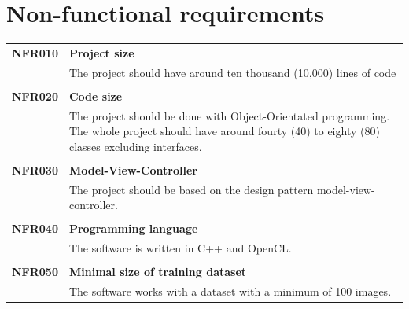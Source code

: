 \documentclass[parskip=full]{scrartcl}
\begin{document}
\section{Non-functional requirements}
\begin{tabular}{p{2cm}p{11.4cm}}
\textbf{NFR010} & \textbf{Project size}\\
& The project should have around ten thousand (10,000) lines of code \\
& \\
\textbf{NFR020} & \textbf{Code size}\\
& The project should be done with Object-Orientated programming. The whole project should have around fourty (40) to eighty (80) classes excluding interfaces. \\
& \\
\textbf{NFR030} & \textbf{Model-View-Controller}\\
& The project should be based on the design pattern model-view-controller. \\
& \\
\textbf{NFR040} & \textbf{Programming language}\\
& The software is written in C++ and OpenCL.\\
& \\
\textbf{NFR050} & \textbf{Minimal size of training dataset}\\
& The software works with a dataset with a minimum of 100 images.
\end{tabular}
\end{document}

